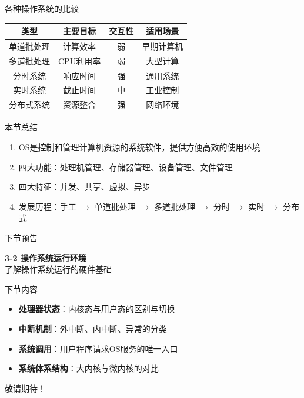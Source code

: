 \documentclass[10pt, aspectratio=169]{beamer}
\begin{document}
\begin{frame}{各种操作系统的比较}
    \begin{tabular}{|c|c|c|c|}
        \hline
        类型 & 主要目标 & 交互性 & 适用场景 \\
        \hline
        单道批处理 & 计算效率 & 弱 & 早期计算机 \\
        多道批处理 & CPU利用率 & 弱 & 大型计算 \\
        分时系统 & 响应时间 & 强 & 通用系统 \\
        实时系统 & 截止时间 & 中 & 工业控制 \\
        分布式系统 & 资源整合 & 强 & 网络环境 \\
        \hline
    \end{tabular}
\end{frame}

\begin{frame}{本节总结}
    \begin{enumerate}
        \item OS是控制和管理计算机资源的系统软件，提供方便高效的使用环境
        \item 四大功能：处理机管理、存储器管理、设备管理、文件管理
        \item 四大特征：并发、共享、虚拟、异步
        \item 发展历程：手工 $\to$ 单道批处理 $\to$ 多道批处理 $\to$ 分时 $\to$ 实时 $\to$ 分布式
    \end{enumerate}
\end{frame}

\begin{frame}{下节预告}
    \begin{center}
    \vspace{1em}
    {\Large \textbf{3-2 操作系统运行环境}}\\
    \vspace{0.3em}
    \textcolor{408blue}{了解操作系统运行的硬件基础}
    \vspace{1em}
    \end{center}
    \begin{block}{下节内容}
        \begin{itemize}
            \item \textbf{处理器状态}：内核态与用户态的区别与切换
            \item \textbf{中断机制}：外中断、内中断、异常的分类
            \item \textbf{系统调用}：用户程序请求OS服务的唯一入口
            \item \textbf{系统体系结构}：大内核与微内核的对比
        \end{itemize}
    \end{block}
    \vspace{0.5em}
    \begin{center}
        \textcolor{408orange}{敬请期待！}
    \end{center}
\end{frame}
\end{document}
